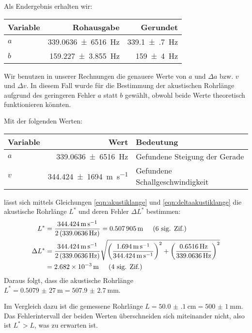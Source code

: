 	Als Endergebnis erhalten wir:
	\begin{center}
		\begin{tabular}{l r r}
			\toprule
			Variable & Rohausgabe & Gerundet \\
			\midrule
			$a$ & \SI{339,0636(6516)}{\hertz} & \SI{339.1(7)}{\hertz} \\
			$b$ & \SI{159.227(3855)}{\hertz} & \SI{159(4)}{\hertz} \\
			\bottomrule
		\end{tabular}
	\end{center}
	Wir benutzen in unserer Rechnungen die genauere Werte von $a$ und $\Delta a$ bzw. $v$ und $\Delta v$. In diesem Fall wurde für die Bestimmung der akustischen Rohrlänge aufgrund des geringeren Fehler $a$ statt $b$ gewählt, obwohl beide Werte theoretisch funktionieren könnten. 

	Mit der folgenden Werten:
    \begin{center}
        \begin{tabular}{lrl}
            \toprule
            Variable & Wert & Bedeutung \\
            \midrule
            $a$ & \SI{339,0636(6516)}{\hertz} & Gefundene Steigung der Gerade \\
            $v$ & \SI{344,424(1694)}{\meter\per\second} & Gefundene Schallgeschwindigkeit \\
            \bottomrule
        \end{tabular}
    \end{center}
    lässt sich mittels Gleichungen \eqref{eqn:akustiklange} und \eqref{eqn:deltaakustiklange} die akustische Rohrlänge $L^{*}$ und deren Fehler $\Delta L^{*}$ bestimmen:
    \begin{align}
    	L^{*} &= \frac{\SI{344,424}{\meter\per\second}}{2\left(\SI{339,0636}{\hertz}\right)} = \SI{0,507905}{\meter} \hspace{0.5cm}\text{(6 sig. Zif.)} \\
    	\Delta L^{*} &= \frac{\SI{344,424}{\meter\per\second}}{2\left(\SI{339,0636}{\hertz}\right)} \sqrt{\left(\frac{\SI{1.694}{\meter\per\second}}{\SI{344,424}{\meter\per\second}}\right)^2 + \left(\frac{\SI{0.6516}{\hertz}}{\SI{339,0636}{\hertz}}\right)^2} \notag \\
    	&= \SI{2,682e-3}{\meter} \hspace{0.5cm}\text{(4 sig. Zif.)}
    \end{align}
    Daraus folgt, dass die akustische Rohrlänge $L^{*} = \SI{0,5079(27)}{\meter} = \SI{507.9(27)}{\milli\meter}$.

    Im Vergleich dazu ist die gemessene Rohrlänge $L = \SI{50.0(1)}{\centi\meter} = \SI{500(1)}{\milli\meter}$. Das Fehlerintervall der beiden Werten überschneiden sich miteinander nicht, also ist $L^{*} > L$, was zu erwarten ist. 